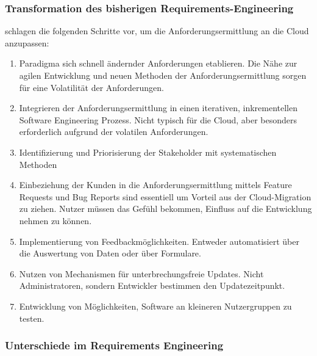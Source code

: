 \subsubsection{Transformation des bisherigen Requirements-Engineering}
 schlagen die folgenden Schritte 
vor, um die Anforderungsermittlung an die Cloud anzupassen:
\begin{enumerate}
	\item Paradigma sich schnell ändernder Anforderungen etablieren. Die 
Nähe zur agilen Entwicklung und neuen Methoden der Anforderungsermittlung 
sorgen für eine Volatilität der Anforderungen.
	\item Integrieren der Anforderungsermittlung in einen iterativen, 
inkrementellen Software Engineering Prozess. Nicht typisch für die Cloud, aber 
besonders erforderlich aufgrund der volatilen Anforderungen.
	\item Identifizierung und Priorisierung der Stakeholder mit 
systematischen Methoden
	\item Einbeziehung der Kunden in die Anforderungsermittlung mittels 
Feature Requests und Bug Reports sind essentiell um Vorteil aus der 
Cloud-Migration zu ziehen. Nutzer müssen das Gefühl bekommen, Einfluss auf die 
Entwicklung nehmen zu können.
	\item Implementierung von Feedbackmöglichkeiten. Entweder automatisiert 
über die Auswertung von Daten oder über Formulare. 
	\item Nutzen von Mechanismen für unterbrechungsfreie Updates. Nicht 
Administratoren, sondern Entwickler bestimmen den Updatezeitpunkt.
	\item Entwicklung von Möglichkeiten, Software an kleineren 
Nutzergruppen zu testen.
\end{enumerate}


\subsubsection{Unterschiede im Requirements Engineering}


